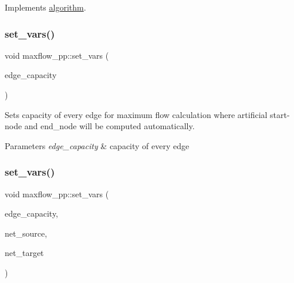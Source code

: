 Implements \mbox{\hyperlink{classalgorithm_a482eb28cacba018b5a86d3a819a50a2f}{algorithm}}.

\mbox{\label{classmaxflow__pp_ac77f4c613efe7857e053f9bfb103dc3e}} 
\subsubsection{\texorpdfstring{set\+\_\+vars()}{set\_vars()}\hspace{0.1cm}{\footnotesize\ttfamily [1/2]}}
{\footnotesize\ttfamily void maxflow\+\_\+pp\+::set\+\_\+vars (\begin{DoxyParamCaption}\item[{const \mbox{\hyperlink{classedge__map}{edge\+\_\+map}}$<$ double $>$ \&}]{edge\+\_\+capacity }\end{DoxyParamCaption})}

Sets capacity of every edge for maximum flow calculation where artificial start-\/node and end\+\_\+node will be computed automatically.


\begin{DoxyParams}{Parameters}
{\em edge\+\_\+capacity} & capacity of every edge \\
\hline
\end{DoxyParams}
\mbox{\label{classmaxflow__pp_a13756f76387cc114b88a44e324fc93ae}} 
\subsubsection{\texorpdfstring{set\+\_\+vars()}{set\_vars()}\hspace{0.1cm}{\footnotesize\ttfamily [2/2]}}
{\footnotesize\ttfamily void maxflow\+\_\+pp\+::set\+\_\+vars (\begin{DoxyParamCaption}\item[{const \mbox{\hyperlink{classedge__map}{edge\+\_\+map}}$<$ double $>$ \&}]{edge\+\_\+capacity,  }\item[{const \mbox{\hyperlink{classnode}{node}} \&}]{net\+\_\+source,  }\item[{const \mbox{\hyperlink{classnode}{node}} \&}]{net\+\_\+target }\end{DoxyParamCaption})}


